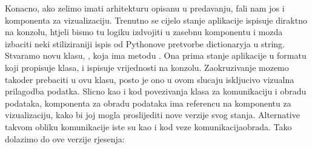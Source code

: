 \documentclass[letterpaper,10pt,croatian]{sphinxmanual}
\begin{document}
\sphinxAtStartPar
Konacno, ako zelimo imati arhitekturu opisanu u predavanju, fali nam jos i
komponenta za vizualizaciju. Trenutno se cijelo stanje aplikacije ispisuje
diraktno na konzolu, htjeli bismo tu logiku izdvojiti u zasebnu komponentu i
mozda izbaciti neki stiliziraniji ispis od Pythonove pretvorbe dictionary\sphinxhyphen{}ja u
string. Stvaramo novu klasu, , koja ima metodu . Ona prima
stanje aplikacije u formatu koji propisuje  klasa, i ispisuje
vrijednosti na konzolu. Zaokruzivanje mozemo takoder prebaciti u ovu klasu,
posto je ono u ovom slucaju iskljucivo vizualna prilagodba podatka. Slicno kao
i kod povezivanja klasa za komunikaciju i obradu podataka, komponenta za obradu
podataka ima referencu na komponentu za vizualizaciju, kako bi joj mogla
proslijediti nove verzije svog stanja. Alternative takvom obliku komunikacije
iste su kao i kod veze komunikacija\sphinxhyphen{}obrada. Tako dolazimo do ove verzije
rjesenja:
\end{document}
